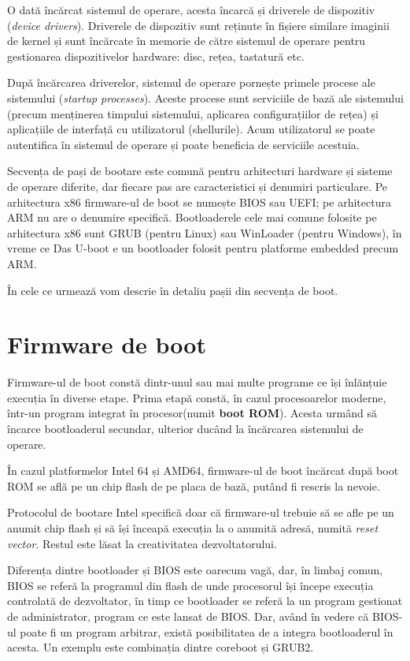 O dată încărcat sistemul de operare, acesta încarcă și driverele de dispozitiv
(\textit{device drivers}). Driverele de dispozitiv sunt reținute în fișiere similare
imaginii de kernel și sunt încărcate în memorie de către sistemul de operare
pentru gestionarea dispozitivelor hardware: disc, rețea, tastatură etc.

După încărcarea driverelor, sistemul de operare pornește primele procese ale
sistemului (\textit{startup processes}). Aceste procese sunt serviciile de bază ale
sistemului (precum menținerea timpului sistemului, aplicarea configurațiilor de
rețea) și aplicațiile de interfață cu utilizatorul (shellurile). Acum
utilizatorul se poate autentifica în sistemul de operare și poate beneficia de
serviciile acestuia.

Secvența de pași de bootare este comună pentru arhitecturi hardware și sisteme
de operare diferite, dar fiecare pas are caracteristici și denumiri particulare.
Pe arhitectura x86 firmware-ul de boot se numește BIOS sau UEFI; pe arhitectura
ARM nu are o denumire specifică. Bootloaderele cele mai comune folosite pe arhitectura x86 sunt
GRUB (pentru Linux) sau WinLoader (pentru Windows), în vreme ce Das U-boot e un
bootloader folosit pentru platforme embedded precum ARM.

În cele ce urmează vom descrie în detaliu pașii din secvența de boot.

\section{Firmware de boot}
\label{sec:boot:firmware}

Firmware-ul de boot constă dintr-unul sau mai multe programe ce își înlănțuie execuția
în diverse etape. Prima etapă constă, în cazul procesoarelor moderne, într-un program
integrat în procesor(numit \textbf{boot ROM}). Acesta urmând să încarce bootloaderul secundar,
ulterior ducând la încărcarea sistemului de operare.

În cazul platformelor Intel 64 și AMD64, firmware-ul de boot încărcat după boot ROM
se află pe un chip flash de pe placa de bază, putând fi rescris la nevoie.

Protocolul de bootare Intel specifică doar că firmware-ul trebuie să se afle pe un anumit chip
flash și să își înceapă execuția la o anumită adresă, numită \textit{reset vector}.
Restul este lăsat la creativitatea dezvoltatorului.

Diferența dintre bootloader și BIOS este oarecum vagă, dar, în limbaj comun, BIOS se referă
la programul din flash de unde procesorul își începe execuția controlată de dezvoltator,
în timp ce bootloader se referă la un program gestionat de administrator, program ce este lansat
de BIOS. Dar, având în vedere că BIOS-ul poate fi un program arbitrar, există posibilitatea
de a integra bootloaderul în acesta. Un exemplu este combinația dintre coreboot și GRUB2.

